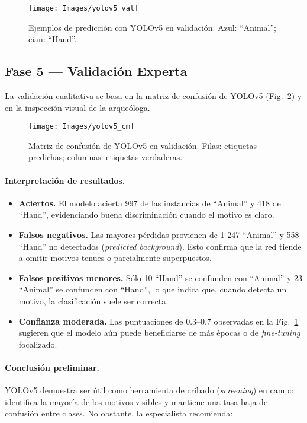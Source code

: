 \begin{figure}[!ht]
  \centering
  \texttt{[image: Images/yolov5\_val]}
  \caption{Ejemplos de predicción con YOLOv5 en validación. Azul: “Animal”; cian: “Hand”.}
  \label{fig:yolov5_val}
\end{figure}

\subsection{Fase 5 — Validación Experta}
\label{ssec:fase5_experta}

La validación cualitativa se basa en la matriz de confusión de YOLOv5 (Fig.~\ref{fig:yolov5_cm}) y en la inspección visual de la arqueóloga.

\begin{figure}[!ht]
  \centering
  \texttt{[image: Images/yolov5\_cm]}
  \caption{Matriz de confusión de YOLOv5 en validación.
           Filas: etiquetas predichas; columnas: etiquetas verdaderas.}
  \label{fig:yolov5_cm}
\end{figure}

\paragraph{Interpretación de resultados.}

\begin{itemize}
  \item \textbf{Aciertos.}
        El modelo acierta 997 de las instancias de “Animal” y 418 de “Hand”, evidenciando buena discriminación cuando el motivo es claro.
  \item \textbf{Falsos negativos.}
        Las mayores pérdidas provienen de 1 247 “Animal” y 558 “Hand” no detectados (\emph{predicted background}).
        Esto confirma que la red tiende a omitir motivos tenues o parcialmente superpuestos.
  \item \textbf{Falsos positivos menores.}
        Sólo 10 “Hand” se confunden con “Animal” y 23 “Animal” se confunden con “Hand”, lo que indica que, cuando detecta un motivo, la clasificación suele ser correcta.
  \item \textbf{Confianza moderada.}
        Las puntuaciones de 0.3–0.7 observadas en la Fig.~\ref{fig:yolov5_val} sugieren que el modelo aún puede beneficiarse de más épocas o de \emph{fine-tuning} focalizado.
\end{itemize}

\paragraph{Conclusión preliminar.}
YOLOv5 demuestra ser útil como herramienta de cribado (\emph{screening}) en campo: identifica la mayoría de los motivos visibles y mantiene una tasa baja de confusión entre clases.
No obstante, la especialista recomienda:

